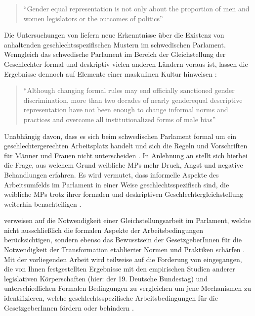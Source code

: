 \documentclass[12pt, 
    twoside=false, 
    bibliography=totoc, 
    numbers=endperiod, 
    headings=normal, 
    toc=chapterentrydotfill
    ]{scrbook}
\begin{document}
 \begin{quote}
 \enquote{Gender equal representation is not only about the proportion of men and women legislators or the outcomes of politics}\parencite[197]{erikson_2018}
 \end{quote}
Die Untersuchungen von \textcite{erikson_2018} liefern neue Erkenntnisse über die Existenz von anhaltenden geschlechtsspezifischen Mustern im schwedischen Parlament. Wenngleich das schwedische Parlament im Bereich der Gleichstellung der Geschlechter formal und deskriptiv vielen anderen Ländern voraus ist, lassen die Ergebnisse dennoch auf Elemente einer maskulinen Kultur hinweisen \parencite[211]{erikson_2018}:
\begin{quote}
\enquote{Although changing formal rules
may end officially sanctioned gender discrimination, more than two decades of nearly genderequal
descriptive representation have not been enough to change informal norms and practices and
overcome all institutionalized forms of male bias} \parencite[211]{erikson_2018}
\end{quote}

Unabhängig davon, dass es sich beim schwedischen Parlament formal um ein geschlechtergerechten Arbeitsplatz handelt und sich die Regeln und Vorschriften für Männer und Frauen nicht unterscheiden \parencite[211]{erikson_2018}. In Anlehnung an \textcite{erikson_2018} stellt sich hierbei die Frage, aus welchem Grund weibliche MPs mehr Druck, Angst und negative Behandlungen erfahren. Es wird vermutet, dass informelle Aspekte des Arbeitsumfelds im Parlament in einer Weise geschlechtsspezifisch sind, die weibliche MPs trotz ihrer formalen und deskriptiven Geschlechtergleichstellung weiterhin benachteiligen \parencite[210]{erikson_2018}.

\textcite{erikson_2018} verweisen auf die Notwendigkeit einer Gleichstellungsarbeit im Parlament, welche nicht ausschließlich die formalen Aspekte der Arbeitsbedingungen berücksichtigen, sondern ebenso das Bewusstsein der GesetzgeberInnen für die Notwendigkeit der Transformation etablierter Normen und Praktiken schärfen \parencite[211]{erikson_2018}.
Mit der vorliegenden Arbeit wird teilweise auf die Forderung von\textcite{erikson_2018} eingegangen, die von Ihnen festgestellten Ergebnisse mit den empirischen Studien anderer legislativen Körperschaften (hier: der 19. Deutsche Bundestag) und unterschiedlichen Formalen Bedingungen zu vergleichen um jene Mechanismen zu identifizieren, welche geschlechtsspezifische Arbeitsbedingungen für die GesetzgeberInnen fördern oder behindern \parencite[211]{erikson_2018}. 
\end{document}
